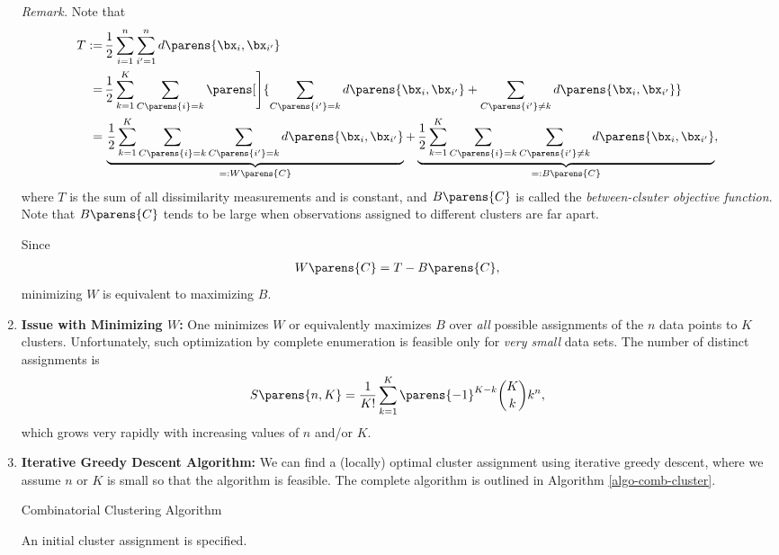 \documentclass[12pt]{article}
\begin{document}
\begin{enumerate}[label=\textbf{\arabic*.}]
	\textit{Remark.} Note that 
	\begin{align*}
		T := & \, \frac{1}{2} \sum_{i=1}^n \sum_{i'=1}^n d \parens{\bx_i, \bx_{i'}} \\ 
		= & \, \frac{1}{2} \sum_{k=1}^K \sum_{C \parens{i} = k} \parens[\Bigg]{ \sum_{C \parens{i'} = k} d \parens{\bx_i, \bx_{i'}} + \sum_{C \parens{i'} \neq k} d \parens{\bx_i, \bx_{i'}} } \\ 
		= & \, \underbrace{\frac{1}{2} \sum_{k=1}^K \sum_{C \parens{i} = k} \sum_{C \parens{i'} = k} d \parens{\bx_i, \bx_{i'}}}_{=: W \parens{C}} + \underbrace{\frac{1}{2} \sum_{k=1}^K \sum_{C \parens{i} = k} \sum_{C \parens{i'} \neq k} d \parens{\bx_i, \bx_{i'}} }_{=: B \parens{C}}, 
	\end{align*}
	where $T$ is the sum of all dissimilarity measurements and is constant, and $B \parens{C}$ is called the \emph{between-clsuter objective function}. Note that $B \parens{C}$ tends to be large when observations assigned to different clusters are far apart. 
	
	Since 
	\begin{align*}
		W \parens{C} = T - B \parens{C}, 
	\end{align*}
	minimizing $W$ is equivalent to maximizing $B$. 
	
	\item \textbf{Issue with Minimizing $W$:} One minimizes $W$ or equivalently maximizes $B$ over \emph{all} possible assignments of the $n$ data points to $K$ clusters. Unfortunately, such optimization by complete enumeration is feasible only for \emph{very small} data sets. The number of distinct assignments is 
	\begin{align}\label{eq-comb-cluster-num}
		S \parens{n, K} = \frac{1}{K!} \sum_{k=1}^K \parens{-1}^{K-k} {K \choose k} k^n, 
	\end{align}
	which grows very rapidly with increasing values of $n$ and/or $K$. 
	
	\item \textbf{Iterative Greedy Descent Algorithm:} We can find a (locally) optimal cluster assignment using iterative greedy descent, where we assume $n$ or $K$ is small so that the algorithm is feasible. The complete algorithm is outlined in Algorithm \ref{algo-comb-cluster}. 
	
	\begin{minipage}{\linewidth}
	\begin{algorithm}[H]
		\caption{Combinatorial Clustering Algorithm}\label{algo-comb-cluster}
		\begin{algorithmic}[1]
			\REQUIRE An initial cluster assignment is specified. 
			

\end{algorithmic}
\end{algorithm}
\end{minipage}
\end{enumerate}
\end{document}
